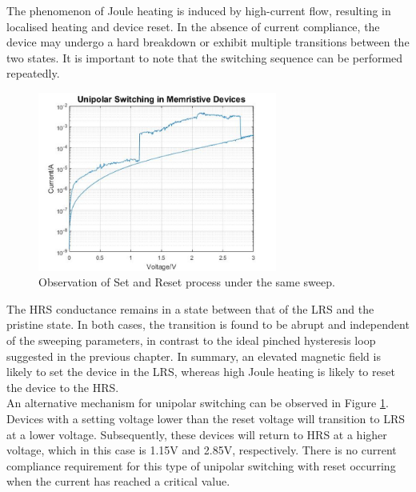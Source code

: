 \noindent The phenomenon of Joule heating is induced by high-current flow, resulting in localised heating and device reset. In the absence of current compliance, the device may undergo a hard breakdown or exhibit multiple transitions between the two states. It is important to note that the switching sequence can be performed repeatedly.\\ 

\begin{figure}[htbp!] 
    \centering    
    \includegraphics[width=0.7\textwidth]{Chapter3/Figs/i.png}
    \caption[Observation of Set and Reset process under the same sweep.]{Observation of Set and Reset process under the same sweep.}
    \label{fig:3i}
\end{figure}

\noindent The HRS conductance remains in a state between that of the LRS and the pristine state. In both cases, the transition is found to be abrupt and independent of the sweeping parameters, in contrast to the ideal pinched hysteresis loop suggested in the previous chapter. In summary, an elevated magnetic field is likely to set the device in the LRS, whereas high Joule heating is likely to reset the device to the HRS.\\


\noindent An alternative mechanism for unipolar switching can be observed in Figure \ref{fig:3i}. Devices with a setting voltage lower than the reset voltage will transition to LRS at a lower voltage. Subsequently, these devices will return to HRS at a higher voltage, which in this case is 1.15V and 2.85V, respectively. There is no current compliance requirement for this type of unipolar switching with reset occurring when the current has reached a critical value. \\

